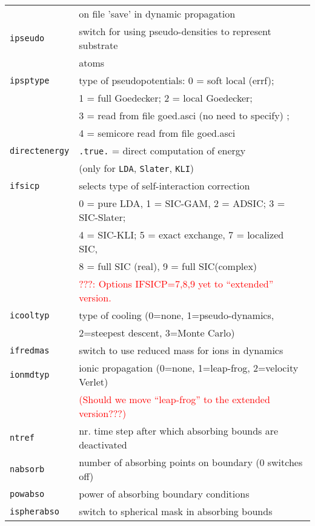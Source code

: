 \documentclass[12pt]{article}
\begin{document}
\begin{tabular}{ll}
{\tt                  }& on file 'save' in dynamic propagation\\
{\tt ipseudo          }& switch for using pseudo-densities to represent substrate\\
{\tt                  }& atoms \\
{\tt ipsptype         }& type of pseudopotentials: 0 = soft local (errf);\\
                       & 1 = full Goedecker; 2 = local Goedecker;\\
                       & 3 = read from file goed.asci (no need to specify)  ;\\
                       & 4 = semicore read from file goed.asci\\
{\tt directenergy}   & {\tt .true.} = direct computation of energy \\
                       & (only for {\tt LDA}, {\tt Slater}, {\tt KLI})\\
{\tt ifsicp           }& selects type of self-interaction correction\\
    &  0 = pure LDA, 1 = SIC-GAM, 2 = ADSIC; 3 = SIC-Slater; \\
    &  4 = SIC-KLI; 5 = exact exchange, 7 = localized SIC,\\
    &  8 = full SIC (real), 9 = full SIC(complex)\\
    & \textcolor{red}{???: Options IFSICP=7,8,9 yet to ``extended'' version.}\\
{\tt icooltyp         }& type of cooling (0=none, 1=pseudo-dynamics,\\
{\tt                  }& 2=steepest descent, 3=Monte Carlo)\\
{\tt ifredmas         }& switch to use reduced mass for ions in dynamics\\
{\tt ionmdtyp         }& ionic propagation
                         (0=none, 1=leap-frog, 2=velocity Verlet)\\
 & \textcolor{red}{(Should we move ``leap-frog'' to the extended version???)}\\
{\tt ntref}& nr. time step after which absorbing bounds are deactivated
\\
{\tt nabsorb}          & number of absorbing points on boundary (0 switches off) 
\\
{\tt powabso}          & power of absorbing boundary conditions
\\
{\tt ispherabso}       & switch to spherical mask in absorbing bounds
\\
\hline
\end{tabular}
\end{document}
